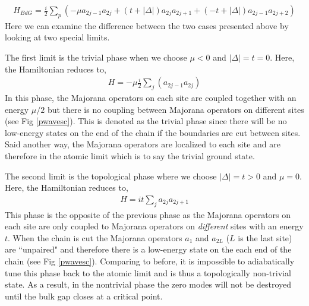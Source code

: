 \begin{align}
	H_{BdG} = \frac{i}{2}\sum_{p}\left(-\mu a_{2j-1}a_{2j}+(t+|\Delta|)a_{2j}a_{2j+1}+(-t+|\Delta|)a_{2j-1}a_{2j+2}\right)
\end{align}
Here we can examine the difference between the two cases presented above by looking at two special limits.\par 
The first limit is the trivial phase when we choose $\mu < 0$ and $|\Delta|=t=0$. Here, the Hamiltonian reduces to,
\begin{align}
	H = -\mu\frac{i}{2}\sum_{j}(a_{2j-1}a_{2j})
\end{align}
In this phase, the Majorana operators on each site are coupled together with an energy $\mu/2$ but there is no coupling between Majorana operators on different sites (see Fig \ref{pwavesc}). This is denoted as the trivial phase since there will be no low-energy states on the end of the chain if the boundaries are cut between sites. Said another way, the Majorana operators are localized to each site and are therefore in the atomic limit which is to say the trivial ground state.\par 
The second limit is the topological phase where we choose $|\Delta|=t>0$ and $\mu=0$. Here, the Hamiltonian reduces to,
\begin{align}
	H=it\sum_{j}a_{2j}a_{2j+1}
\end{align}
This phase is the opposite of the previous phase as the Majorana operators on each site are only coupled to Majorana operators on \textit{different} sites with an energy $t$. When the chain is cut the Majorana operators $a_{1}$ and $a_{2L}$ ($L$ is the last site) are ``unpaired" and therefore there is a low-energy state on the each end of the chain (see Fig \ref{pwavesc}). Comparing to before, it is impossible to adiabatically tune this phase back to the atomic limit and is thus a topologically non-trivial state. As a result, in the nontrivial phase the zero modes will not be destroyed until the bulk gap closes at a critical point.\par 
